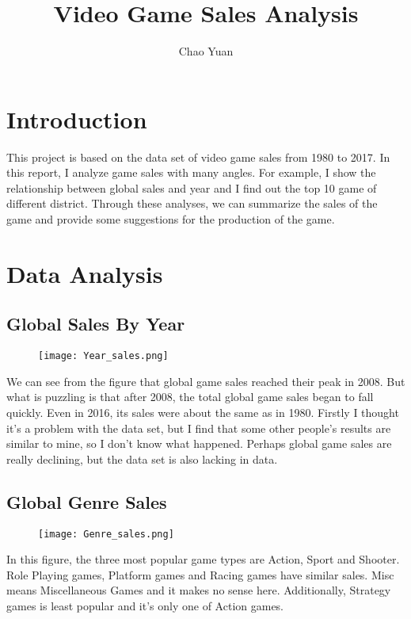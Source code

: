 \documentclass{article}
\title{Video Game Sales Analysis}
\author{Chao Yuan}
\begin{document}
	\maketitle
	\section{Introduction}
	This project is based on the data set of video game sales from 1980 to 2017. In this report, I analyze game sales with many angles. For example, I show the relationship between global sales and year and I find out the top 10 game of different district. Through these analyses, we can summarize the sales of the game and provide some suggestions for the production of the game.
	
	\section{Data Analysis}
	
	\subsection{Global Sales By Year}
	\begin{figure}[htbp]
	\centering
	\texttt{[image: Year\_sales.png]}
	\end{figure}

	We can see from the figure that global game sales reached their peak in 2008. But what is puzzling is that after 2008, the total global game sales began to fall quickly. Even in 2016, its sales were about the same as in 1980. Firstly I thought it's a problem with the data set, but I find that some other people's results are similar to mine, so I don't know what happened. Perhaps global game sales are really declining, but the data set is also lacking in data.

	\newpage
	\subsection{Global Genre Sales }
	\begin{figure}[htbp]
	\centering
	\texttt{[image: Genre\_sales.png]}
	\end{figure}
	In this figure, the three most popular game types are Action, Sport and Shooter. Role Playing games, Platform games and Racing games have similar sales. Misc means Miscellaneous Games and it makes no sense here. Additionally, Strategy games is least popular and it's only one of Action games.
	
\end{document}
